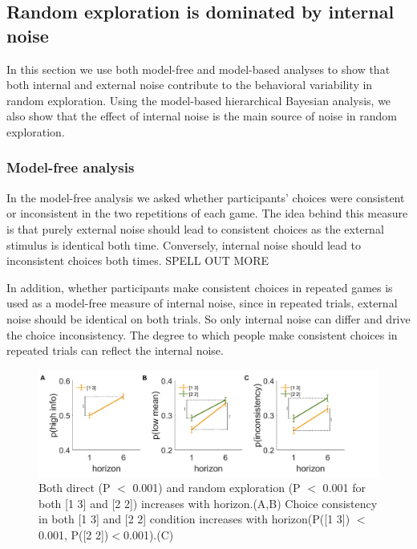 \documentclass[12pt]{article}
\begin{document}
	\subsection*{Random exploration is dominated by internal noise}
	
	In this section we use both model-free and model-based analyses to show that both internal and external noise contribute to the behavioral variability in random exploration. Using the model-based hierarchical Bayesian analysis, we also show that the effect of internal noise is the main source of noise in random exploration.
	
	\subsubsection*{Model-free analysis}
	
	In the model-free analysis we asked whether participants' choices were  consistent or inconsistent in the two repetitions of each game.  The idea behind this measure is that purely external noise should lead to consistent choices as the external stimulus is identical both time.  Conversely, internal noise should lead to inconsistent choices both times.  SPELL OUT MORE
	
	
	
	
	In addition, whether participants make consistent choices in repeated games is used as a model-free measure of internal noise, since in repeated trials, external noise should be identical on both trials. So only internal noise can differ and drive the choice inconsistency. The degree to which people make consistent choices in repeated trials can reflect the internal noise. 
	
	\begin{figure}[H]
		\begin{center}
			\includegraphics[width=\textwidth]{figures/Modelfree.png}
			\caption{Both direct (P $<$ 0.001) and random exploration (P $<$ 0.001 for both [1 3] and [2 2]) increases with horizon.(A,B) Choice consistency in both [1 3] and [2 2] condition increases with horizon(P([1 3]) $<$ 0.001, P([2 2])$<$0.001).(C)}
			\label{fig:mf}
		\end{center}
	\end{figure}
	
\end{document}
